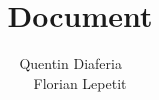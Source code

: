 \documentclass[a4paper,12pt]{article}
\title{Document}
\author{Quentin Diaferia ~~\\ Florian Lepetit}
\begin{document}
\maketitle

\begin{center}
\end{center}

\newpage

\tableofcontents

\newpage



\newpage


\end{document}
